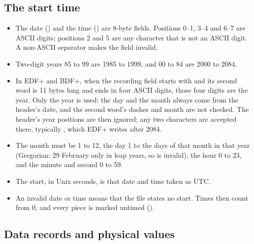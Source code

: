 \subsection{The start time}
\label{sec:formats-reference-edf-start}

\begin{itemize}
\item The date () and the time () are 8-byte fields. Positions 0--1,
  3--4 and 6--7 are ASCII digits; positions 2 and 5 are any character that is not an ASCII digit.
  A non-ASCII separator makes the field invalid.
\item Two-digit years 85 to 99 are 1985 to 1999, and 00 to 84 are 2000 to 2084.
\item In EDF+ and BDF+, when the recording field starts with  and its second
  word is 11 bytes long and ends in four ASCII digits, those four digits are the year. Only the
  year is used: the day and the month always come from the header's date, and the second word's
  dashes and month are not checked. The header's year positions are then ignored; any two
  characters are accepted there, typically , which EDF+ writes after 2084.
\item The month must be 1 to 12, the day 1 to the days of that month in that year (Gregorian: 29
  February only in leap years, so  is invalid), the hour 0 to 23, and the minute
  and second 0 to 59.
\item The start, in Unix seconds, is that date and time taken as UTC.
\item An invalid date or time means that the file states no start. Times then count from 0, and
  every piece is marked untimed ().
\end{itemize}

\subsection{Data records and physical values}
\label{sec:formats-reference-edf-records}

